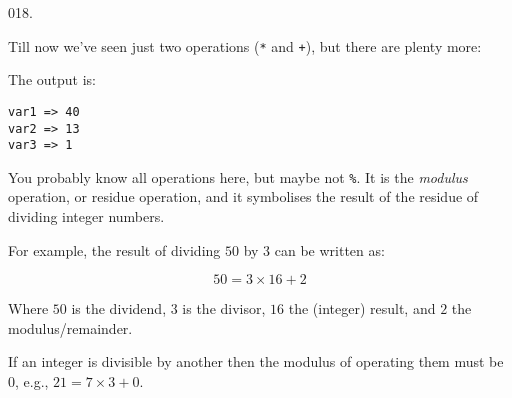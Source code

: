 \documentclass[]{book}
\newenvironment{Shaded}{}{}
\newcommand{\BuiltInTok}[1]{#1}
\newcommand{\DataTypeTok}[1]{\textcolor[rgb]{0.56,0.13,0.00}{#1}}
\newcommand{\DecValTok}[1]{\textcolor[rgb]{0.25,0.63,0.44}{#1}}
\newcommand{\NormalTok}[1]{#1}
\newcommand{\StringTok}[1]{\textcolor[rgb]{0.25,0.44,0.63}{#1}}
\begin{document}
\vspace{2mm}\noindent\hrulefill{}

\begin{minipage}{\linewidth}\noindent
{\tiny 018.}\\
\begin{minipage}[t]{.485\linewidth}

Till now we've seen just two operations (\texttt{*} and \texttt{+}), but
there are plenty more:

\begin{framed}

\begin{Shaded}
\end{Shaded}

\end{framed}

\end{minipage}
\hfill
\begin{minipage}[t]{.485\linewidth}

The output is:

\begin{framed}

\begin{verbatim}
var1 => 40
var2 => 13
var3 => 1
\end{verbatim}

\end{framed}

You probably know all operations here, but maybe not \texttt{\%}. It is
the \emph{modulus} operation, or residue operation, and it symbolises
the result of the residue of dividing integer numbers.

For example, the result of dividing \(50\) by \(3\) can be written as:

\[ 50 = 3 \times 16 + 2 \]

Where \(50\) is the dividend, \(3\) is the divisor, \(16\) the (integer)
result, and \(2\) the modulus/remainder.

If an integer is divisible by another then the modulus of operating them
must be \(0\), e.g., \(21 = 7 \times 3 + 0\).

\end{minipage}
\end{minipage}
\end{document}
